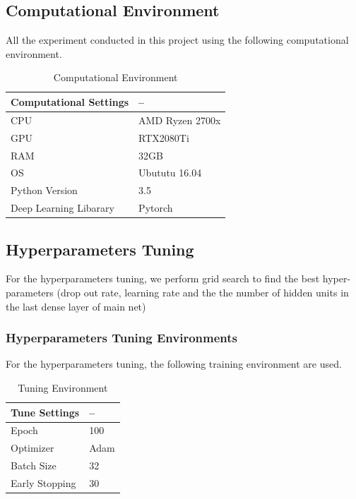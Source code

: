 \documentclass{article}
\begin{document}
\subsection{Computational Environment}

All the experiment conducted in this project using the following computational environment. 
\begin{table}[htb]
	\caption{Computational Environment}
	\label{sample-table}
	\centering
	\begin{tabular}{ll}
		\toprule
		\cmidrule{1-2}
		Computational Settings & -- \\
		\midrule
		CPU & AMD Ryzen 2700x \\
		GPU & RTX2080Ti \\
		RAM & 32GB \\
		OS & Ubututu 16.04 \\
		Python Version & 3.5 \\
		Deep Learning Libarary & Pytorch \\
		\midrule
	\end{tabular}
\end{table}
\subsection{Hyperparameters Tuning}
For the hyperparameters tuning, we perform grid search to find the best hyper-parameters (drop out rate, learning rate and the the number of hidden units in the last dense layer of main net)

\subsubsection{Hyperparameters Tuning Environments}
For the hyperparameters tuning, the following training environment are used. 

\pagebreak

\begin{table}[htb]
	\caption{Tuning Environment}
	\label{sample-table}
	\centering
	\begin{tabular}{ll}
		\toprule
		\cmidrule{1-2}
		Tune Settings & -- \\
		\midrule
		Epoch & 100 \\
		Optimizer & Adam \\
		Batch Size & 32 \\
		Early Stopping & 30 \\
		\midrule
	\end{tabular}
\end{table}
\end{document}
